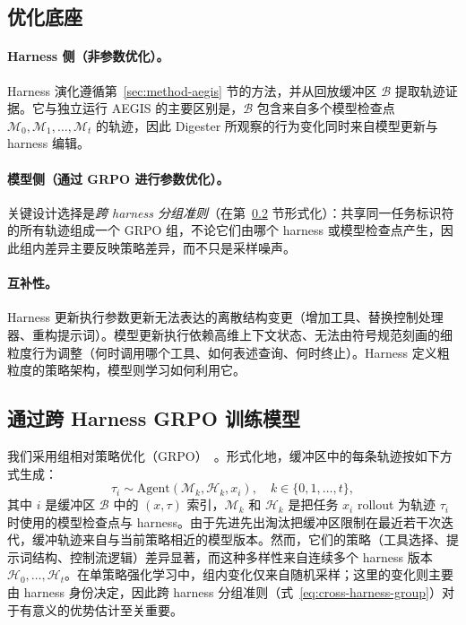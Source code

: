 \subsection{优化底座}
\label{sec:coevolution-dual-grpo}

\paragraph{Harness 侧（非参数优化）。}
Harness 演化遵循第~\ref{sec:method-aegis} 节的方法，并从回放缓冲区 $\mathcal{B}$ 提取轨迹证据。它与独立运行 AEGIS 的主要区别是，$\mathcal{B}$ 包含来自多个模型检查点 $\mathcal{M}_0,\mathcal{M}_1,\ldots,\mathcal{M}_t$ 的轨迹，因此 Digester 所观察的行为变化同时来自模型更新与 harness 编辑。

\paragraph{模型侧（通过 GRPO 进行参数优化）。}
关键设计选择是\textit{跨 harness 分组准则}（在第~\ref{sec:coevolution-grpo} 节形式化）：共享同一任务标识符的所有轨迹组成一个 GRPO 组，不论它们由哪个 harness 或模型检查点产生，因此组内差异主要反映策略差异，而不只是采样噪声。

\paragraph{互补性。}
Harness 更新执行参数更新无法表达的离散结构变更（增加工具、替换控制处理器、重构提示词）。模型更新执行依赖高维上下文状态、无法由符号规范刻画的细粒度行为调整（何时调用哪个工具、如何表述查询、何时终止）。Harness 定义粗粒度的策略架构，模型则学习如何利用它。

\subsection{通过跨 Harness GRPO 训练模型}
\label{sec:coevolution-grpo}

我们采用组相对策略优化（GRPO）~\cite{shao2024deepseekmath}。形式化地，缓冲区中的每条轨迹按如下方式生成：
\begin{equation}
  \tau_i\sim\text{Agent}(\mathcal{M}_k,\mathcal{H}_k,x_i),\quad k\in\{0,1,\ldots,t\},
  \label{eq:trajectory-generation}
\end{equation}
其中 $i$ 是缓冲区 $\mathcal{B}$ 中的 $(x,\tau)$ 索引，$\mathcal{M}_k$ 和 $\mathcal{H}_k$ 是把任务 $x_i$ rollout 为轨迹 $\tau_i$ 时使用的模型检查点与 harness。由于先进先出淘汰把缓冲区限制在最近若干次迭代，缓冲轨迹来自与当前策略相近的模型版本。然而，它们的策略（工具选择、提示词结构、控制流逻辑）差异显著，而这种多样性来自连续多个 harness 版本 $\mathcal{H}_0,\ldots,\mathcal{H}_t$。在单策略强化学习中，组内变化仅来自随机采样；这里的变化则主要由 harness 身份决定，因此跨 harness 分组准则（式~\ref{eq:cross-harness-group}）对于有意义的优势估计至关重要。

